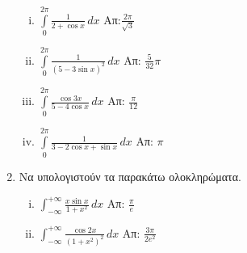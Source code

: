 \documentclass[a4paper,table]{report}
\begin{document}
\begin{enumerate}
  \begin{enumerate}[i)]
    \item $\int\limits_0^{2\pi}\frac{1}{2+\cos x}\,dx$ \hfill Απ:$\frac{2
      \pi}{\sqrt{3}}$
    \item $\int\limits_0^{2\pi}\frac{1}{(5-3\sin x)^2}\,dx$ \hfill Απ: $\frac{5}{32}\pi$
    \item $\int\limits_0^{2\pi}\frac{\cos 3x}{5-4\cos x}\,dx$ 
      \hfill Απ: $\frac{\pi}{12}$
    \item $\int\limits_0^{2\pi}\frac{1}{3-2\cos x+\sin x}\,dx$ \hfill Απ: $\pi$
  \end{enumerate}

\item Να υπολογιστούν τα παρακάτω ολοκληρώματα.

  \begin{enumerate}[i)]
    \item $\int_{-\infty}^{+\infty}\frac{x\sin x}{1+x^2}\,dx$ 
      \hfill  Απ: $\frac{\pi}{e}$
    \item $\int_{-\infty}^{+\infty}\frac{\cos 2x}{(1+x^2)^2}\,dx$ 
      \hfill  Απ: $\frac{3\pi}{2e^2}$
  \end{enumerate}
\end{enumerate}
\end{document}

